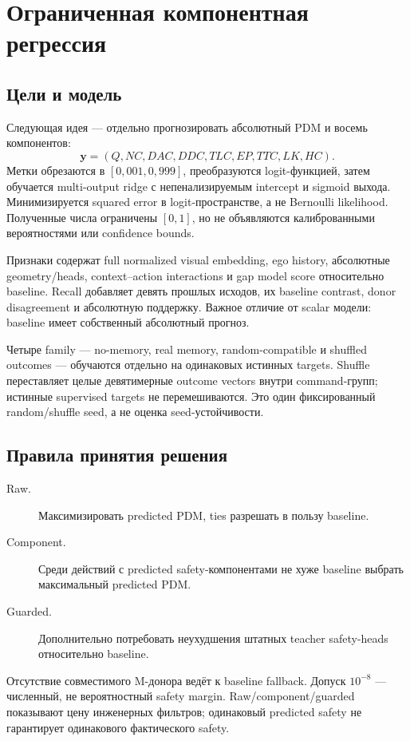\documentclass[11pt,a4paper]{article}
\begin{document}
\section{Ограниченная компонентная регрессия}
\subsection{Цели и модель}
Следующая идея --- отдельно прогнозировать абсолютный PDM и восемь компонентов:
\begin{equation}
 \mathbf y=(Q,NC,DAC,DDC,TLC,EP,TTC,LK,HC).
\end{equation}
Метки обрезаются в $[0{,}001,0{,}999]$, преобразуются logit-функцией, затем обучается multi-output ridge с непенализируемым intercept и sigmoid выхода. Минимизируется squared error в logit-пространстве, а не Bernoulli likelihood. Полученные числа ограничены $[0,1]$, но не объявляются калиброванными вероятностями или confidence bounds.

Признаки содержат full normalized visual embedding, ego history, абсолютные geometry/heads, context--action interactions и gap model score относительно baseline. Recall добавляет девять прошлых исходов, их baseline contrast, donor disagreement и абсолютную поддержку. Важное отличие от scalar модели: baseline имеет собственный абсолютный прогноз.

Четыре family --- no-memory, real memory, random-compatible и shuffled outcomes --- обучаются отдельно на одинаковых истинных targets. Shuffle переставляет целые девятимерные outcome vectors внутри command-групп; истинные supervised targets не перемешиваются. Это один фиксированный random/shuffle seed, а не оценка seed-устойчивости.

\subsection{Правила принятия решения}
\begin{description}
\item[Raw.] Максимизировать predicted PDM, ties разрешать в пользу baseline.
\item[Component.] Среди действий с predicted safety-компонентами не хуже baseline выбрать максимальный predicted PDM.
\item[Guarded.] Дополнительно потребовать неухудшения штатных teacher safety-heads относительно baseline.
\end{description}
Отсутствие совместимого M-донора ведёт к baseline fallback. Допуск $10^{-8}$ --- численный, не вероятностный safety margin. Raw/component/guarded показывают цену инженерных фильтров; одинаковый predicted safety не гарантирует одинакового фактического safety.
\end{document}
